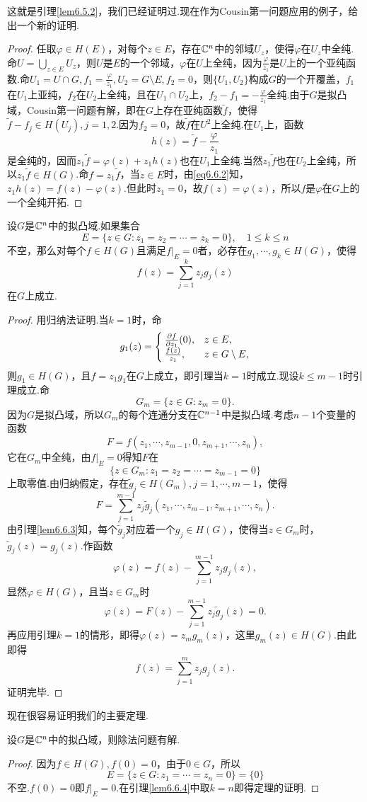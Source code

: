 这就是引理\ref{lem6.5.2}，我们已经证明过.现在作为Cousin第一问题应用的例子，给出一个新的证明.
\begin{proof}
	任取$\varphi\in H(E)$，对每个$z\in E$，存在$\mathbb C^n$中的邻域$U_z$，使得$\varphi$在$U_z$中全纯.命$U=\bigcup_{z\in E}U_z$，则$U$是$E$的一个邻域，$\varphi$在$U$上全纯，因为$\frac{\varphi}{z_1}$是$U$上的一个亚纯函数.命$U_1=U\cap G,f_1=\frac{\varphi}{z_1},U_2=G\setminus E,f_2=0$，则$\{U_1,U_2\}$构成$G$的一个开覆盖，$f_1$在$U_1$上亚纯，$f_2$在$U_2$上全纯，且在$U_1\cap U_2$上，$f_2-f_1=-\frac{\varphi}{z_1}$全纯.由于$G$是拟凸域，Cousin第一问题有解，即在$G$上存在亚纯函数$\widetilde{f}$，使得$\widetilde{f}-f_j\in H(U_j),j=1,2$.因为$f_2=0$，故$\widetilde{f}$在$U^2$上全纯.在$U_1$上，函数
	\begin{equation}\label{eq6.6.2}
		h(z)=\widetilde{f}-\frac{\varphi}{z_1}
	\end{equation}
	是全纯的，因而$z_1\widetilde{f}=\varphi(z)+z_1h(z)$也在$U_1$上全纯.当然$z_1\widetilde{f}$也在$U_2$上全纯，所以$z_1\widetilde{f}\in H(G)$.命$f=z_1\widetilde{f}$，当$z\in E$时，由\eqref{eq6.6.2}知，$z_1h(z)=f(z)-\varphi(z)$.但此时$z_1=0$，故$f(z)=\varphi(z)$，所以$f$是$\varphi$在$G$上的一个全纯开拓.
\end{proof}
\begin{lemma}\label{lem6.6.4}
	设$G$是$\mathbb C^n$中的拟凸域.如果集合
	\[E=\{z\in G\colon z_1=z_2=\cdots=z_k=0\},\quad 1\le k\le n\]
	不空，那么对每个$f\in H(G)$且满足$f|_E=0$者，必存在$g_1,\cdots,g_k\in H(G)$，使得
	\[f(z)=\sum_{j=1}^{k}z_jg_j(z)\]
	在$G$上成立.
\end{lemma}
\begin{proof}
	用归纳法证明.当$k=1$时，命
	\[g_1(z)=\begin{cases}
		\frac{\partial f}{\partial z_1}(0),&z\in E,\\
		\frac{f(z)}{z_1},&z\in G\setminus E,
	\end{cases}\]
	则$g_1\in H(G)$，且$f=z_1g_1$在$G$上成立，即引理当$k=1$时成立.现设$k\le m-1$时引理成立.命
	\[G_m=\{z\in G\colon z_m=0\}.\]
	因为$G$是拟凸域，所以$G_m$的每个连通分支在$\mathbb C^{n-1}$中是拟凸域.考虑$n-1$个变量的函数
	\[F=f(z_1,\cdots,z_{m-1},0,z_{m+1},\cdots,z_n),\]
	它在$G_m$中全纯，由$f|_E=0$得知$F$在
	\[\{z\in G_m\colon z_1=z_2=\cdots=z_{m-1}=0\}\]
	上取零值.由归纳假定，存在$\widetilde{g}_j\in H(G_m),j=1,\cdots,m-1$，使得
	\[F=\sum_{j=1}^{m-1}z_j\widetilde{g}_j(z_1,\cdots,z_{m-1},z_{m+1},\cdots,z_n).\]
	由引理\ref{lem6.6.3}知，每个$\widetilde{g}_j$对应着一个$g_j\in H(G)$，使得当$z\in G_m$时，$\widetilde{g}_j(z)=g_j(z)$.作函数
	\[\varphi(z)=f(z)-\sum_{j=1}^{m-1}z_jg_j(z),\]
	显然$\varphi\in H(G)$，且当$z\in G_m$时
	\[\varphi(z)=F(z)-\sum_{j=1}^{m-1}z_j\widetilde{g}_j(z)=0.\]
	再应用引理$k=1$的情形，即得$\varphi(z)=z_mg_m(z)$，这里$g_m(z)\in H(G)$.由此即得
	\[f(z)=\sum_{j=1}^{m}z_jg_j(z).\]
	证明完毕.
\end{proof}
现在很容易证明我们的主要定理.
\begin{theorem}\label{thm6.6.5}
	设$G$是$\mathbb C^n$中的拟凸域，则除法问题有解.
\end{theorem}
\begin{proof}
	因为$f\in H(G),f(0)=0$，由于$0\in G$，所以
	\[E=\{z\in G\colon z_1=\cdots=z_n=0\}=\{0\}\]
	不空.$f(0)=0$即$f|_E=0$.在引理\ref{lem6.6.4}中取$k=n$即得定理的证明.
\end{proof}
